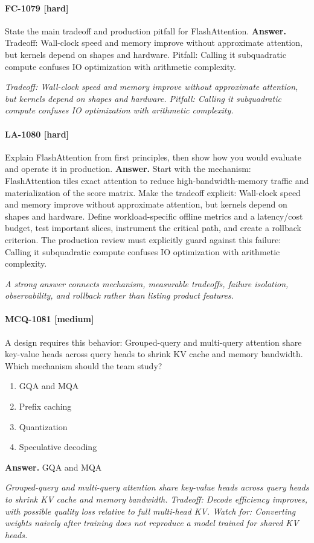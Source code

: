 \paragraph{FC-1079 [hard]} State the main tradeoff and production pitfall for FlashAttention.
\noindent\textbf{Answer.} Tradeoff: Wall-clock speed and memory improve without approximate attention, but kernels depend on shapes and hardware. Pitfall: Calling it subquadratic compute confuses IO optimization with arithmetic complexity.
\par\textit{Tradeoff: Wall-clock speed and memory improve without approximate attention, but kernels depend on shapes and hardware. Pitfall: Calling it subquadratic compute confuses IO optimization with arithmetic complexity.}
\paragraph{LA-1080 [hard]} Explain FlashAttention from first principles, then show how you would evaluate and operate it in production.
\noindent\textbf{Answer.} Start with the mechanism: FlashAttention tiles exact attention to reduce high-bandwidth-memory traffic and materialization of the score matrix. Make the tradeoff explicit: Wall-clock speed and memory improve without approximate attention, but kernels depend on shapes and hardware. Define workload-specific offline metrics and a latency/cost budget, test important slices, instrument the critical path, and create a rollback criterion. The production review must explicitly guard against this failure: Calling it subquadratic compute confuses IO optimization with arithmetic complexity.
\par\textit{A strong answer connects mechanism, measurable tradeoffs, failure isolation, observability, and rollback rather than listing product features.}
\paragraph{MCQ-1081 [medium]} A design requires this behavior: Grouped-query and multi-query attention share key-value heads across query heads to shrink KV cache and memory bandwidth. Which mechanism should the team study?
\begin{enumerate}[label=\Alph*.]
\item GQA and MQA
\item Prefix caching
\item Quantization
\item Speculative decoding
\end{enumerate}
\noindent\textbf{Answer.} GQA and MQA
\par\textit{Grouped-query and multi-query attention share key-value heads across query heads to shrink KV cache and memory bandwidth. Tradeoff: Decode efficiency improves, with possible quality loss relative to full multi-head KV. Watch for: Converting weights naively after training does not reproduce a model trained for shared KV heads.}
